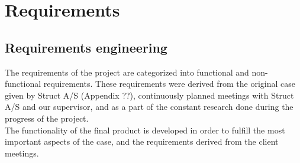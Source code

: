 
\chapter{Requirements} %

\label{Chapter3} %


\section{Requirements engineering}
The requirements of the project are categorized into functional and non-functional requirements. These requirements were derived from the original case given by Struct A/S (Appendix ??), continuously planned meetings with Struct A/S and our supervisor, and as a part of the constant research done during the progress of the project. \\
The functionality of the final product is developed in order to fulfill the most important aspects of the case, and the requirements derived from the client meetings.

